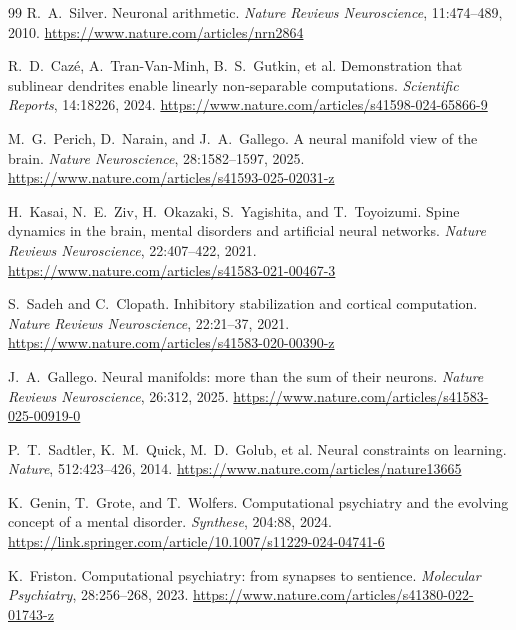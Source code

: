 \documentclass[11pt]{article}
\theoremstyle{remark}
\theoremstyle{plain}
\begin{document}
\begin{thebibliography}{99}
R.\ A.\ Silver.
\newblock Neuronal arithmetic.
\newblock \emph{Nature Reviews Neuroscience}, 11:474--489, 2010.
\newblock \url{https://www.nature.com/articles/nrn2864}

R.\ D.\ Caz\'e, A.\ Tran-Van-Minh, B.\ S.\ Gutkin, et al.
\newblock Demonstration that sublinear dendrites enable linearly non-separable computations.
\newblock \emph{Scientific Reports}, 14:18226, 2024.
\newblock \url{https://www.nature.com/articles/s41598-024-65866-9}

M.\ G.\ Perich, D.\ Narain, and J.\ A.\ Gallego.
\newblock A neural manifold view of the brain.
\newblock \emph{Nature Neuroscience}, 28:1582--1597, 2025.
\newblock \url{https://www.nature.com/articles/s41593-025-02031-z}

H.\ Kasai, N.\ E.\ Ziv, H.\ Okazaki, S.\ Yagishita, and T.\ Toyoizumi.
\newblock Spine dynamics in the brain, mental disorders and artificial neural networks.
\newblock \emph{Nature Reviews Neuroscience}, 22:407--422, 2021.
\newblock \url{https://www.nature.com/articles/s41583-021-00467-3}

S.\ Sadeh and C.\ Clopath.
\newblock Inhibitory stabilization and cortical computation.
\newblock \emph{Nature Reviews Neuroscience}, 22:21--37, 2021.
\newblock \url{https://www.nature.com/articles/s41583-020-00390-z}

J.\ A.\ Gallego.
\newblock Neural manifolds: more than the sum of their neurons.
\newblock \emph{Nature Reviews Neuroscience}, 26:312, 2025.
\newblock \url{https://www.nature.com/articles/s41583-025-00919-0}

P.\ T.\ Sadtler, K.\ M.\ Quick, M.\ D.\ Golub, et al.
\newblock Neural constraints on learning.
\newblock \emph{Nature}, 512:423--426, 2014.
\newblock \url{https://www.nature.com/articles/nature13665}

K.\ Genin, T.\ Grote, and T.\ Wolfers.
\newblock Computational psychiatry and the evolving concept of a mental disorder.
\newblock \emph{Synthese}, 204:88, 2024.
\newblock \url{https://link.springer.com/article/10.1007/s11229-024-04741-6}

K.\ Friston.
\newblock Computational psychiatry: from synapses to sentience.
\newblock \emph{Molecular Psychiatry}, 28:256--268, 2023.
\newblock \url{https://www.nature.com/articles/s41380-022-01743-z}


\end{thebibliography}
\end{document}
